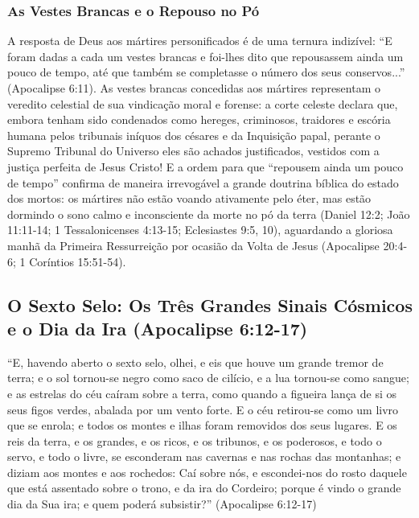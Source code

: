 \subsubsection*{As Vestes Brancas e o Repouso no Pó}
A resposta de Deus aos mártires personificados é de uma ternura indizível:
``E foram dadas a cada um vestes brancas e foi-lhes dito que repousassem ainda um pouco de tempo, até que também se completasse o número dos seus conservos...'' (Apocalipse 6:11).
As vestes brancas concedidas aos mártires representam o veredito celestial de sua vindicação moral e forense: a corte celeste declara que, embora tenham sido condenados como hereges, criminosos, traidores e escória humana pelos tribunais iníquos dos césares e da Inquisição papal, perante o Supremo Tribunal do Universo eles são achados justificados, vestidos com a justiça perfeita de Jesus Cristo!
E a ordem para que ``repousem ainda um pouco de tempo'' confirma de maneira irrevogável a grande doutrina bíblica do estado dos mortos: os mártires não estão voando ativamente pelo éter, mas estão dormindo o sono calmo e inconsciente da morte no pó da terra (Daniel 12:2; João 11:11-14; 1 Tessalonicenses 4:13-15; Eclesiastes 9:5, 10), aguardando a gloriosa manhã da Primeira Ressurreição por ocasião da Volta de Jesus (Apocalipse 20:4-6; 1 Coríntios 15:51-54).



\subsection{O Sexto Selo: Os Três Grandes Sinais Cósmicos e o Dia da Ira (Apocalipse 6:12-17)}


``E, havendo aberto o sexto selo, olhei, e eis que houve um grande tremor de terra; e o sol tornou-se negro como saco de cilício, e a lua tornou-se como sangue; e as estrelas do céu caíram sobre a terra, como quando a figueira lança de si os seus figos verdes, abalada por um vento forte. E o céu retirou-se como um livro que se enrola; e todos os montes e ilhas foram removidos dos seus lugares. E os reis da terra, e os grandes, e os ricos, e os tribunos, e os poderosos, e todo o servo, e todo o livre, se esconderam nas cavernas e nas rochas das montanhas; e diziam aos montes e aos rochedos: Caí sobre nós, e escondei-nos do rosto daquele que está assentado sobre o trono, e da ira do Cordeiro; porque é vindo o grande dia da Sua ira; e quem poderá subsistir?'' (Apocalipse 6:12-17)

